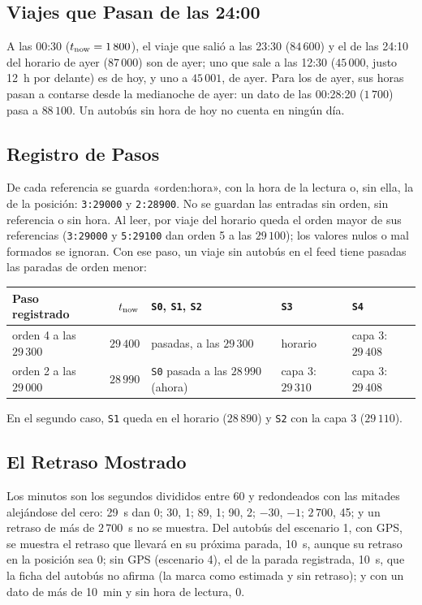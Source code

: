 \subsection{Viajes que Pasan de las 24:00} A las 00:30 ($t_{\mathrm{now}}=1\,800$), el viaje que salió a las 23:30
($84\,600$) y el de las 24:10 del horario de ayer ($87\,000$) son de ayer; uno que sale a las 12:30 ($45\,000$, justo
12~h por delante) es de hoy, y uno a $45\,001$, de ayer. Para los de ayer, sus horas pasan a contarse desde la
medianoche de ayer: un dato de las 00:28:20 ($1\,700$) pasa a $88\,100$. Un autobús sin hora de hoy no cuenta en ningún día.

\subsection{Registro de Pasos} De cada referencia se guarda «orden:hora», con la hora de la lectura o, sin ella, la de
la posición: \texttt{3:29000} y \texttt{2:28900}. No se guardan las entradas sin orden, sin referencia o sin hora. Al
leer, por viaje del horario queda el orden mayor de sus referencias (\texttt{3:29000} y \texttt{5:29100} dan orden 5 a
las $29\,100$); los valores nulos o mal formados se ignoran. Con ese paso, un viaje sin autobús en el feed tiene pasadas
las paradas de orden menor:

\begin{center}
\small
\begin{tabular}{@{}lrlll@{}}
\toprule
Paso registrado & $t_{\mathrm{now}}$ & \texttt{S0}, \texttt{S1}, \texttt{S2} & \texttt{S3} & \texttt{S4}\\
\midrule
orden 4 a las $29\,300$ & $29\,400$ & pasadas, a las $29\,300$ & horario & capa 3: $29\,408$\\
orden 2 a las $29\,000$ & $28\,990$ & \texttt{S0} pasada a las $28\,990$ (ahora) & capa 3: $29\,310$ & capa 3: $29\,408$\\
\bottomrule
\end{tabular}
\end{center}

\noindent En el segundo caso, \texttt{S1} queda en el horario ($28\,890$) y \texttt{S2} con la capa 3 ($29\,110$).

\subsection{El Retraso Mostrado} Los minutos son los segundos divididos entre 60 y redondeados con las mitades
alejándose del cero:
29~s dan 0; 30, 1; 89, 1; 90, 2; $-30$, $-1$; $2\,700$, 45; y un retraso de más de $2\,700$~s no se muestra. Del autobús
del escenario 1, con GPS, se muestra el retraso que llevará en su próxima parada, 10~s, aunque su retraso en la
posición sea 0; sin GPS (escenario 4), el de la parada registrada, 10~s, que la ficha del autobús no afirma (la marca como
estimada y sin retraso); y con un dato de más de 10~min y sin hora de
lectura, 0.

